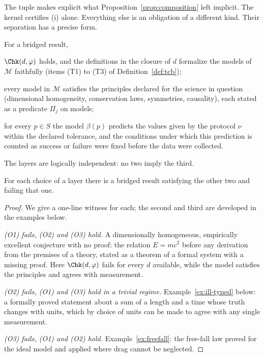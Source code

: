 The tuple makes explicit what Proposition~\ref{prop:composition} left implicit. The kernel certifies (i) alone. Everything else is an obligation of a different kind. Their separation has a precise form.

\begin{definition}
\label{def:layers}
For a bridged result,
\begin{description}[leftmargin=1.5em,nosep]
\item[(O1) mathematical correctness:] $\Chk(d,\varphi)$ holds, and the definitions in the closure of $d$ formalize the models of $\mathcal{M}$ faithfully (items (T1) to (T3) of Definition~\ref{def:tcb});
\item[(O2) compatibility with principles:] every model in $\mathcal{M}$ satisfies the principles declared for the science in question (dimensional homogeneity, conservation laws, symmetries, causality), each stated as a predicate $\Pi_j$ on models;
\item[(O3) correspondence:] for every $p\in S$ the model $\beta(p)$ predicts the values given by the protocol $\nu$ within the declared tolerance, and the conditions under which this prediction is counted as success or failure were fixed before the data were collected.
\end{description}
\end{definition}

The layers are logically independent: no two imply the third.

\begin{proposition}
\label{prop:independence-layers}
For each choice of a layer there is a bridged result satisfying the other two and failing that one.
\end{proposition}

\begin{proof}
We give a one-line witness for each; the second and third are developed in the examples below.

\emph{(O1) fails, (O2) and (O3) hold.} A dimensionally homogeneous, empirically excellent conjecture with no proof: the relation $E=mc^2$ before any derivation from the premises of a theory, stated as a theorem of a formal system with a missing proof. Here $\Chk(d,\varphi)$ fails for every $d$ available, while the model satisfies the principles and agrees with measurement.

\emph{(O2) fails, (O1) and (O3) hold in a trivial regime.} Example~\ref{ex:ill-typed} below: a formally proved statement about a sum of a length and a time whose truth changes with units, which by choice of units can be made to agree with any single measurement.

\emph{(O3) fails, (O1) and (O2) hold.} Example~\ref{ex:freefall}: the free-fall law proved for the ideal model and applied where drag cannot be neglected.
\end{proof}

